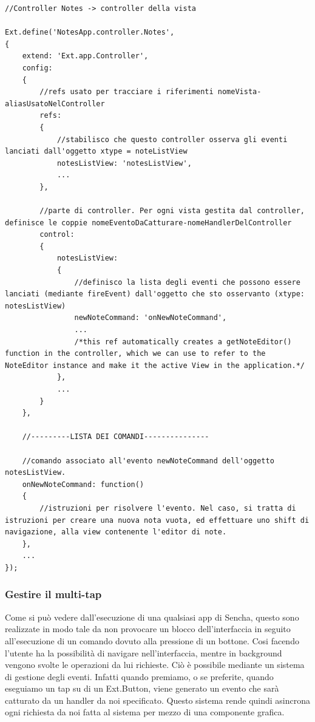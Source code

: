 \documentclass[10pt,a4paper,onecolumn]{article}
\begin{document}
\begin{lstlisting}
//Controller Notes -> controller della vista 

Ext.define('NotesApp.controller.Notes',
{
	extend: 'Ext.app.Controller',
	config:
	{
		//refs usato per tracciare i riferimenti nomeVista-aliasUsatoNelController
		refs:
		{
			//stabilisco che questo controller osserva gli eventi lanciati dall'oggetto xtype = noteListView
			notesListView: 'notesListView',
			...
		},
		
		//parte di controller. Per ogni vista gestita dal controller, definisce le coppie nomeEventoDaCatturare-nomeHandlerDelController
		control:
		{
			notesListView:
			{
				//definisco la lista degli eventi che possono essere lanciati (mediante fireEvent) dall'oggetto che sto osservanto (xtype: notesListView)
				newNoteCommand: 'onNewNoteCommand',
				...
				/*this ref automatically creates a getNoteEditor() function in the controller, which we can use to refer to the NoteEditor instance and make it the active View in the application.*/
			},
			...	
		}
	},

	//---------LISTA DEI COMANDI---------------
	
	//comando associato all'evento newNoteCommand dell'oggetto notesListView.
	onNewNoteCommand: function()
	{
		//istruzioni per risolvere l'evento. Nel caso, si tratta di istruzioni per creare una nuova nota vuota, ed effettuare uno shift di navigazione, alla view contenente l'editor di note.
	},
	...
});
\end{lstlisting}

\subsubsection{Gestire il multi-tap}

Come si può vedere dall'esecuzione di una qualsiasi app di Sencha, questo sono realizzate in modo tale da non provocare un blocco dell'interfaccia in seguito all'esecuzione di un comando dovuto alla pressione di un bottone. Cosi facendo l'utente ha la possibilità di navigare nell'interfaccia, mentre in background vengono svolte le operazioni da lui richieste. Ciò è possibile mediante un sistema di gestione degli eventi. Infatti quando premiamo, o se preferite, quando eseguiamo un tap su di un Ext.Button, viene generato un evento che sarà catturato da un handler da noi specificato. Questo sistema rende quindi asincrona ogni richiesta da noi fatta al sistema per mezzo di una componente grafica.
\end{document}
